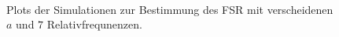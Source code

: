 \begin{figure}[H]
{{{		}\\
	}}
	\caption[Simulationen Nonius-Methode]{Plots der
	Simulationen zur Bestimmung des FSR mit verscheidenen $a$ und $7$ Relativfrequnenzen.}
	\label{fig:nonius_FSR_simulation}
\end{figure}
